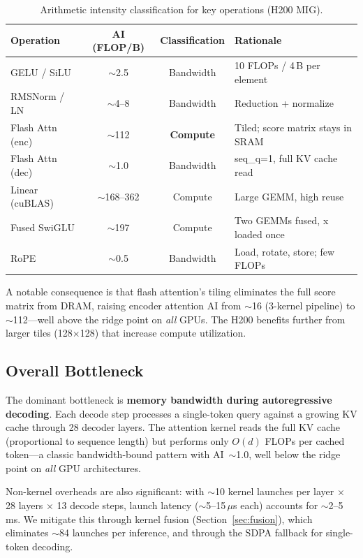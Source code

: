 \documentclass{article}
\begin{document}
\begin{table}[h]
\centering
\caption{Arithmetic intensity classification for key operations (H200 MIG).}
\label{tab:ai}
\small
\begin{tabular}{@{}lccl@{}}
\toprule
\textbf{Operation} & \textbf{AI (FLOP/B)} & \textbf{Classification} & \textbf{Rationale} \\
\midrule
GELU / SiLU & $\sim$2.5 & Bandwidth & 10 FLOPs / 4\,B per element \\
RMSNorm / LN & $\sim$4--8 & Bandwidth & Reduction + normalize \\
Flash Attn (enc) & $\sim$112 & \textbf{Compute} & Tiled; score matrix stays in SRAM \\
Flash Attn (dec) & $\sim$1.0 & Bandwidth & seq\_q=1, full KV cache read \\
Linear (cuBLAS) & $\sim$168--362 & Compute & Large GEMM, high reuse \\
Fused SwiGLU & $\sim$197 & Compute & Two GEMMs fused, x loaded once \\
RoPE & $\sim$0.5 & Bandwidth & Load, rotate, store; few FLOPs \\
\bottomrule
\end{tabular}
\end{table}

A notable consequence is that flash attention's tiling eliminates the full score matrix from DRAM, raising encoder attention AI from $\sim$16 (3-kernel pipeline) to $\sim$112---well above the ridge point on \emph{all} GPUs.  The H200 benefits further from larger tiles (128$\times$128) that increase compute utilization.

\subsection{Overall Bottleneck}

The dominant bottleneck is \textbf{memory bandwidth during autoregressive decoding}.  Each decode step processes a single-token query against a growing KV cache through 28 decoder layers.  The attention kernel reads the full KV cache (proportional to sequence length) but performs only $O(d)$ FLOPs per cached token---a classic bandwidth-bound pattern with AI~$\sim$1.0, well below the ridge point on \emph{all} GPU architectures.

Non-kernel overheads are also significant: with $\sim$10 kernel launches per layer $\times$ 28 layers $\times$ 13 decode steps, launch latency ($\sim$5--15\,$\mu$s each) accounts for $\sim$2--5\,ms.  We mitigate this through kernel fusion (Section~\ref{sec:fusion}), which eliminates $\sim$84 launches per inference, and through the SDPA fallback for single-token decoding.
\end{document}

